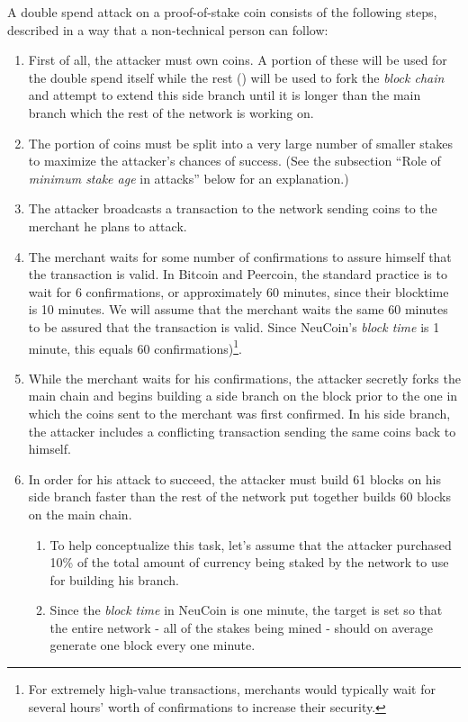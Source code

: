 \documentclass[a4paper,11pt]{article}
\begin{document}
A double spend attack on a proof-of-stake coin consists of the following steps, described in a way that a non-technical person can follow:
\begin{enumerate}
\setlength{\itemsep}{0pt}
\item{First of all, the attacker must own coins. A portion  of these will be used for the double spend itself while the rest () will be used to fork the \textit{block chain} and attempt to extend this side branch until it is longer than the main branch which the rest of the network is working on. }
\item{The portion of coins  must be split into a very large number of smaller stakes to maximize the attacker's chances of success. (See the subsection ``Role of \textit{minimum stake age} in attacks'' below for an explanation.)}
\item{The attacker broadcasts a transaction to the network sending  coins to the merchant he plans to attack.}
\item{The merchant waits for some number of confirmations to assure himself that the transaction is valid. In Bitcoin and Peercoin, the standard practice is to wait for 6 confirmations, or approximately 60 minutes, since their blocktime is 10 minutes. We will assume that the merchant waits the same 60 minutes to be assured that the transaction is valid. Since NeuCoin's \textit{block time} is 1 minute, this equals 60 confirmations)\footnote{ For extremely high-value transactions, merchants would typically wait for several hours' worth of confirmations to increase their security.}.}
\item{While the merchant waits for his confirmations, the attacker secretly forks the main chain and begins building a side branch on the block prior to the one in which the  coins sent to the merchant was first confirmed. In his side branch, the attacker includes a conflicting transaction sending the same  coins back to himself.}
\item{In order for his attack to succeed, the attacker must build 61 blocks on his side branch faster than the rest of the network put together builds 60 blocks on the main chain. 
	\begin{enumerate}
	\setlength{\itemsep}{0pt}
	\item{To help conceptualize this task, let's assume that the attacker purchased 10\% of the total amount of currency being staked by the network to use for building his branch.}
	\item{Since the \textit{block time} in NeuCoin is one minute, the target is set so that the entire network - all of the stakes being mined - should on average generate one block every one minute.}

\end{enumerate}}
\end{enumerate}
\end{document}
